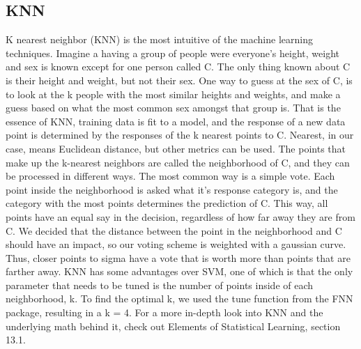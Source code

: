 \documentclass[11pt, oneside]{article}   	%
\begin{document}
\subsection{KNN}
K nearest neighbor (KNN) is the most intuitive of the machine learning techniques. Imagine a having a group of people were everyone's height, weight and sex is known except for one person called C.   The only thing known about C is their height and weight, but not their sex. One way to guess at the sex of C, is to look at the k people with the most similar heights and weights, and make a guess based on what the most common sex amongst that group is. That is the essence of KNN, training data is fit to a model, and the response of a new data point is determined by the responses of the k nearest points to C. Nearest, in our case, means Euclidean distance, but other metrics can be used. The points that make up the k-nearest neighbors are called the neighborhood of C, and they can be processed in different ways. The most common way is a simple vote. Each point inside the neighborhood is asked what it's response category is, and the category with the most points determines the prediction of C. This way, all points have an equal say in the decision, regardless of how far away they are from C. We decided that the distance between the point in the neighborhood and C should have an impact, so our voting scheme is weighted with a gaussian curve. Thus, closer points to sigma have a vote that is worth more than points that are farther away. KNN has some advantages over SVM, one of which is that the only parameter that needs to be tuned is the number of points inside of each neighborhood, k. To find the optimal k, we used the tune function from the FNN package, \cite{FNN} resulting in a k = 4. For a more in-depth look into KNN and the underlying math behind it, check out Elements of Statistical Learning, section 13.1. \cite{KNNBook}
\end{document}
